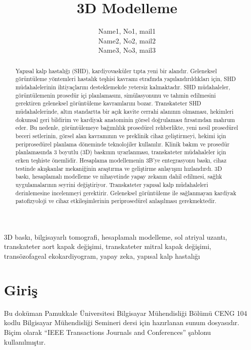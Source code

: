 \documentclass{IEEEtran}
\begin{document}
\title{3D Modelleme}
\author{Name1, No1, mail1 \\ Name2, No2, mail2 \\ Name3, No3, mail3} 



\maketitle

\begin{abstract}
Yapısal kalp hastalığı (SHD), kardiyovasküler tıpta yeni bir alandır. Geleneksel görüntüleme yöntemleri hastalık teşhisi kavramı etrafında yapılandırıldıkları için, SHD müdahalelerinin ihtiyaçlarını desteklemekde yetersiz kalmaktadır. SHD müdahaleler, görüntülemenin prosedür içi planlamasını, simülasyonunu ve tahmin edilmesini gerektiren geleneksel görüntüleme kavramlarını bozar. Transkateter SHD müdahalelerinde, altın standartta bir açık kavite cerrahi alanının olmaması, hekimleri dokunsal geri bildirim ve kardiyak anatominin görsel doğrulaması fırsatından mahrum eder. Bu nedenle, görüntülemeye bağımlılık prosedürel rehberlikte, yeni nesil prosedürel beceri setlerinin, görsel alan kavramının ve preklinik cihaz geliştirmeyi, hekimi için periprosedürel planlama döneminde teknolojiler kullanılır. Klinik bakım ve prosedür planlamasında 3 boyutlu (3D) baskının uyarlanması, transkateter müdahaleler için erken teşhiste önemlidir. Hesaplama modellemenin 3B'ye entegrasyonu baskı, cihaz testinde akışkanlar mekaniğinin araştırma ve geliştirme anlayışını hızlandırdı. 3D baskı, hesaplamalı modelleme ve nihayetinde yapay zekanın dahil edilmesi, sağlık uygulamalarının seyrini değiştiriyor. Transkateter yapısal kalp müdahaleleri derinlemesine incelenmeyi gerektirir. Geleneksel görüntüleme ile sağlanmayan kardiyak patofizyoloji ve cihaz etkileşimlerinin periprosedürel anlaşılması gerekmektedir. 
\end{abstract}

\begin{IEEEkeywords}
3D baskı, bilgisayarlı tomografi, hesaplamalı modelleme, sol atriyal uzantı, transkateter aort kapak değişimi, transkateter mitral kapak değişimi, transözofageal ekokardiyogram, yapay zeka, yapısal kalp hastalığı 
\end{IEEEkeywords}

\section{Giriş}
\label{sec:giris}
Bu doküman Pamukkale Üniversitesi Bilgisayar Mühendisliği Bölümü CENG 104 kodlu Bilgisayar Mühendisliği Semineri dersi için hazırlanan sunum dosyasıdır. Biçim olarak ``IEEE Transactions Journals and Conferences'' şablonu kullanılmıştır.
\end{document}
